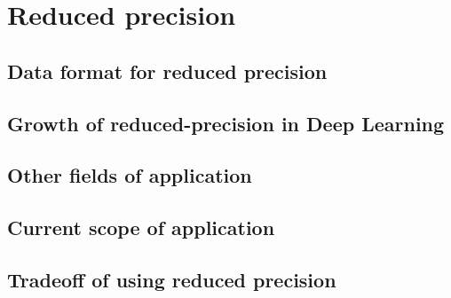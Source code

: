 \chapter{Reduced precision}
\begin{comment}
This section will discuss:
1. What is reduced precision (RP); discuss mixed precision as a sub-category.
2. Advantages of RP (Can make mention on energy consumption)
3. Disavantages of RP.
4. Current field of application (mostly DL).

Alternative outline:
This section will discuss:
1. What is reduced precision (RP); discuss mixed precision as a sub-category.
2. Examples of RP application.
3. Discussion of the prior examples + advanatages/disavantages.
4. Current field of application (mostly DL).

3rd alternative (Same as section 2 but written historically):
historical outline of RP.
How it started, and how it exploded with DL.
RP is great. How relevant to other fields?
\end{comment}





\section{Data format for reduced precision}



\section{Growth of reduced-precision in Deep Learning}

\section{Other fields of application}

\section{Current scope of application}


\section{Tradeoff of using reduced precision}

